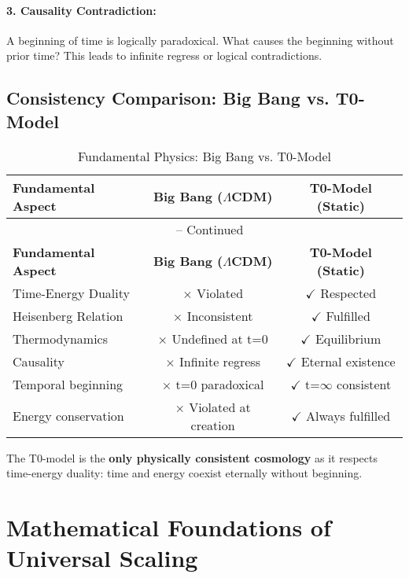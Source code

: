 \documentclass[12pt,a4paper]{article}
\theoremstyle{definition}
\begin{document}
	\paragraph{3. Causality Contradiction:}
	A beginning of time is logically paradoxical. What causes the beginning without prior time? This leads to infinite regress or logical contradictions.
	
	\subsection{Consistency Comparison: Big Bang vs. T0-Model}
	
	\begin{longtable}{lcc}
		\caption{Fundamental Physics: Big Bang vs. T0-Model} \\
		\toprule
		\textbf{Fundamental Aspect} & \textbf{Big Bang ($\Lambda$CDM)} & \textbf{T0-Model (Static)} \\
		\midrule
		\endfirsthead
		\multicolumn{3}{c}{\tablename\ \thetable{} -- Continued} \\
		\toprule
		\textbf{Fundamental Aspect} & \textbf{Big Bang ($\Lambda$CDM)} & \textbf{T0-Model (Static)} \\
		\midrule
		\endhead
		Time-Energy Duality & $\times$ Violated & $\checkmark$ Respected \\
		Heisenberg Relation & $\times$ Inconsistent & $\checkmark$ Fulfilled \\
		Thermodynamics & $\times$ Undefined at t=0 & $\checkmark$ Equilibrium \\
		Causality & $\times$ Infinite regress & $\checkmark$ Eternal existence \\
		Temporal beginning & $\times$ t=0 paradoxical & $\checkmark$ t=$\infty$ consistent \\
		Energy conservation & $\times$ Violated at creation & $\checkmark$ Always fulfilled \\
		\bottomrule
	\end{longtable}
	
	\begin{revolutionary}
		The T0-model is the \textbf{only physically consistent cosmology} as it respects time-energy duality: time and energy coexist eternally without beginning.
	\end{revolutionary}
	
	\section{Mathematical Foundations of Universal Scaling}
	
\end{document}
